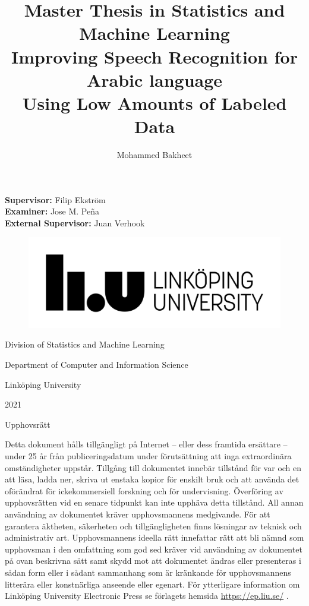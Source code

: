 \documentclass[
  a4paper,
]{article}
\title{\vspace{0.1cm} \LARGE Master Thesis in Statistics and Machine
Learning\\
\vspace{1cm} \textbf{Improving Speech Recognition for Arabic language}\\
\vspace{0.1cm} \textbf{Using Low Amounts of Labeled Data}}
\author{Mohammed Bakheet}
\date{}
\begin{document}
\maketitle

\bigskip

\noindent \textbf{Supervisor:} Filip Ekström\\
\textbf{Examiner:} Jose M. Peña~\\
\textbf{External Supervisor:} Juan Verhook~

\hfill\break
\hfill\break
\hfill\break
\hfill\break
\hfill\break
\hfill\break
\hfill\break
\hfill\break

\begin{figure}[h]
  \includegraphics{liu.png}
\end{figure}

\begin{center}
\LARGE Division of Statistics and Machine Learning  

\LARGE Department of Computer and Information Science  

\LARGE Linköping University   

\LARGE 2021

\end{center}

\newpage

\begin{center}

\large{Upphovsrätt}

\end{center}

Detta dokument hålls tillgängligt på Internet -- eller dess framtida
ersättare -- under 25 år från publiceringsdatum under förutsättning att
inga extraordinära omständigheter uppstår. Tillgång till dokumentet
innebär tillstånd för var och en att läsa, ladda ner, skriva ut enstaka
kopior för enskilt bruk och att använda det oförändrat för
ickekommersiell forskning och för undervisning. Överföring av
upphovsrätten vid en senare tidpunkt kan inte upphäva detta tillstånd.
All annan användning av dokumentet kräver upphovsmannens medgivande. För
att garantera äktheten, säkerheten och tillgängligheten finns lösningar
av teknisk och administrativ art. Upphovsmannens ideella rätt innefattar
rätt att bli nämnd som upphovsman i den omfattning som god sed kräver
vid användning av dokumentet på ovan beskrivna sätt samt skydd mot att
dokumentet ändras eller presenteras i sådan form eller i sådant
sammanhang som är kränkande för upphovsmannens litterära eller
konstnärliga anseende eller egenart. För ytterligare information om
Linköping University Electronic Press se förlagets hemsida
\url{https://ep.liu.se/} .
\end{document}
